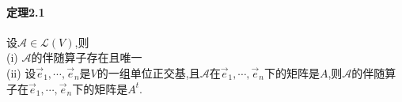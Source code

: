 \documentclass{ctexart}
\begin{document}
\paragraph{定理2.1}
设$\mathcal{A} \in \mathcal{L}(V)$,则\\
(i) $\mathcal{A}$的伴随算子存在且唯一\\
(ii) 设$\vec{e}_{1},\cdots,\vec{e}_{n}$是$V$的一组单位正交基,且$\mathcal{A}$在$\vec{e}_{1},\cdots,\vec{e}_{n}$下的矩阵是$A$,则$\mathcal{A}$的伴随算子在$\vec{e}_{1},\cdots,\vec{e}_{n}$下的矩阵是$A^{t}$.

\ifx\total\undefined 
\end{document}
